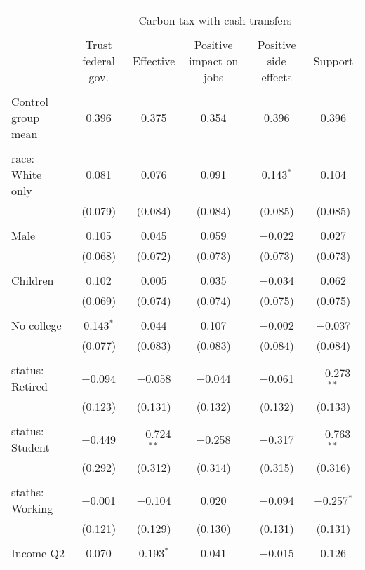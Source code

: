 
\begin{tabular}{@{\extracolsep{5pt}}lccccc} 
\\[-1.8ex]\hline 
\hline \\[-1.8ex] 
 & \multicolumn{5}{c}{Carbon tax with cash transfers} \\ 
\cline{2-6} 
\\[-1.8ex] & Trust federal gov. & Effective & Positive impact on jobs & Positive side effects & Support \\ 
\hline \\[-1.8ex] 
 Control group mean & 0.396 & 0.375 & 0.354 & 0.396 & 0.396  \\ \hline \\[-1.8ex] race: White only & 0.081 & 0.076 & 0.091 & 0.143$^{*}$ & 0.104 \\ 
  & (0.079) & (0.084) & (0.084) & (0.085) & (0.085) \\ 
  & & & & & \\ 
 Male & 0.105 & 0.045 & 0.059 & $-$0.022 & 0.027 \\ 
  & (0.068) & (0.072) & (0.073) & (0.073) & (0.073) \\ 
  & & & & & \\ 
 Children & 0.102 & 0.005 & 0.035 & $-$0.034 & 0.062 \\ 
  & (0.069) & (0.074) & (0.074) & (0.075) & (0.075) \\ 
  & & & & & \\ 
 No college & 0.143$^{*}$ & 0.044 & 0.107 & $-$0.002 & $-$0.037 \\ 
  & (0.077) & (0.083) & (0.083) & (0.084) & (0.084) \\ 
  & & & & & \\ 
 status: Retired & $-$0.094 & $-$0.058 & $-$0.044 & $-$0.061 & $-$0.273$^{**}$ \\ 
  & (0.123) & (0.131) & (0.132) & (0.132) & (0.133) \\ 
  & & & & & \\ 
 status: Student & $-$0.449 & $-$0.724$^{**}$ & $-$0.258 & $-$0.317 & $-$0.763$^{**}$ \\ 
  & (0.292) & (0.312) & (0.314) & (0.315) & (0.316) \\ 
  & & & & & \\ 
 staths: Working & $-$0.001 & $-$0.104 & 0.020 & $-$0.094 & $-$0.257$^{*}$ \\ 
  & (0.121) & (0.129) & (0.130) & (0.131) & (0.131) \\ 
  & & & & & \\ 
 Income Q2 & 0.070 & 0.193$^{*}$ & 0.041 & $-$0.015 & 0.126 \\ 

\end{tabular}
